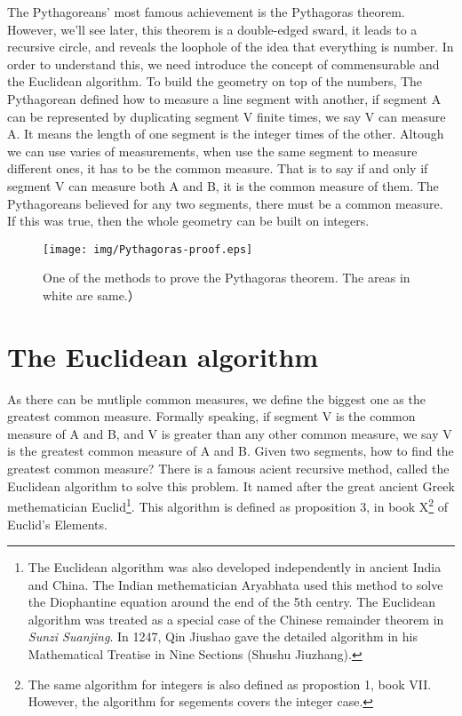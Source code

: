 \documentclass{article}
\begin{document}
The Pythagoreans' most famous achievement is the Pythagoras theorem. However, we'll see later, this theorem is a double-edged sward, it leads to a recursive circle, and reveals the loophole of the idea that everything is number. In order to understand this, we need introduce the concept of commensurable and the Euclidean algorithm. To build the geometry on top of the numbers, The Pythagorean defined how to measure a line segment with another, if segment A can be represented by duplicating segment V finite times, we say V can measure A. It means the length of one segment is the integer times of the other. Altough we can use varies of measurements, when use the same segment to measure different ones, it has to be the common measure. That is to say if and only if segment V can measure both A and B, it is the common measure of them. The Pythagoreans believed for any two segments, there must be a common measure. If this was true, then the whole geometry can be built on integers.

\begin{figure}[htbp]
 \centering
 \texttt{[image: img/Pythagoras-proof.eps]}
 \caption{One of the methods to prove the Pythagoras theorem. The areas in white are same.）}
 \label{fig:Pythagoras-proof}
\end{figure}

\section{The Euclidean algorithm}

As there can be mutliple common measures, we define the biggest one as the greatest common measure. Formally speaking, if segment V is the common measure of A and B, and V is greater than any other common measure, we say V is the greatest common measure of A and B. Given two segments, how to find the greatest common measure? There is a famous acient recursive method, called the Euclidean algorithm to solve this problem. It named after the great ancient Greek methematician Euclid\footnote{The Euclidean algorithm was also developed independently in ancient India and China. The Indian methematician Aryabhata used this method to solve the Diophantine equation around the end of the 5th centry. The Euclidean algorithm was treated as a special case of the Chinese remainder theorem in {\em Sunzi Suanjing}. In 1247, Qin Jiushao gave the detailed algorithm in his Mathematical Treatise in Nine Sections (Shushu Jiuzhang).}. This algorithm is defined as proposition 3, in book X\footnote{The same algorithm for integers is also defined as propostion 1, book VII. However, the algorithm for segements covers the integer case.} of Euclid's Elements\cite{Elements}.
\end{document}
